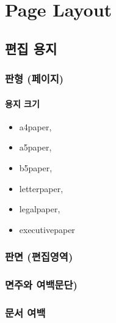 \documentclass[12pt,a4paper]{book}
\begin{document}
	\part{ Page Layout}
			
\newpage
\chapter{편집 용지}

		\minitoc				%


\newpage
\section{판형 (페이지)}

	\subsection{용지 크기}
	
		\begin{itemize}
			\item	a4paper, 
			\item	a5paper, 
			\item	b5paper, 
			\item	letterpaper, 
			\item	legalpaper,
			\item	executivepaper
		\end{itemize}


\newpage
\section{판면 (편집영역)}

\newpage
\section{면주와 여백문단)}

	
	
\newpage  \null
\section{문서 여백}
\end{document}
